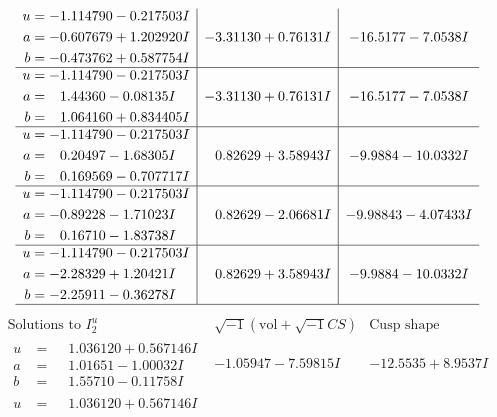 \documentclass[1p]{elsarticle_modified}
\theoremstyle{definition}
\newcommand{\I}{\sqrt{-1}}
\begin{document}
$$\begin{array}{c|c|c}
\begin{aligned}
u &= -1.114790 - 0.217503 I \\
a &= -0.607679 + 1.202920 I \\
b &= -0.473762 + 0.587754 I\end{aligned}
 & -3.31130 + 0.76131 I & -16.5177 - 7.0538 I \\ \hline\begin{aligned}
u &= -1.114790 - 0.217503 I \\
a &= \phantom{-}1.44360 - 0.08135 I \\
b &= \phantom{-}1.064160 + 0.834405 I\end{aligned}
 & -3.31130 + 0.76131 I & -16.5177 - 7.0538 I \\ \hline\begin{aligned}
u &= -1.114790 - 0.217503 I \\
a &= \phantom{-}0.20497 - 1.68305 I \\
b &= \phantom{-}0.169569 - 0.707717 I\end{aligned}
 & \phantom{-}0.82629 + 3.58943 I & -9.9884 - 10.0332 I \\ \hline\begin{aligned}
u &= -1.114790 - 0.217503 I \\
a &= -0.89228 - 1.71023 I \\
b &= \phantom{-}0.16710 - 1.83738 I\end{aligned}
 & \phantom{-}0.82629 - 2.06681 I & -9.98843 - 4.07433 I \\ \hline\begin{aligned}
u &= -1.114790 - 0.217503 I \\
a &= -2.28329 + 1.20421 I \\
b &= -2.25911 - 0.36278 I\end{aligned}
 & \phantom{-}0.82629 + 3.58943 I & -9.9884 - 10.0332 I\\
 \hline 
 \end{array}$$\newpage$$\begin{array}{c|c|c}  
\text{Solutions to }I^u_{2}& \I (\text{vol} + \sqrt{-1}CS) & \text{Cusp shape}\\
 \hline 
\begin{aligned}
u &= \phantom{-}1.036120 + 0.567146 I \\
a &= \phantom{-}1.01651 - 1.00032 I \\
b &= \phantom{-}1.55710 - 0.11758 I\end{aligned}
 & -1.05947 - 7.59815 I & -12.5535 + 8.9537 I \\ \hline\begin{aligned}
u &= \phantom{-}1.036120 + 0.567146 I \\

\end{aligned}
\end{array}$$
\end{document}
